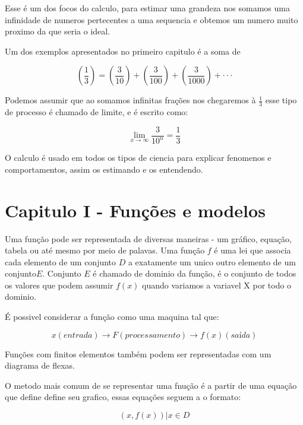\documentclass[paper=a4, fontsize=11pt]{scrartcl} %
\numberwithin{equation}{section} %
\numberwithin{figure}{section} %
\numberwithin{table}{section} %
\begin{document}
Esse é um dos focos do calculo, para estimar uma grandeza nos somamos uma infinidade de numeros pertecentes a uma sequencia e obtemos um numero muito proximo da que seria o ideal.

Um dos exemplos apresentados no primeiro capitulo é a soma de 

\begin{equation}
\left(\frac{1}{3}\right) = \left(\frac{3}{10}\right) + \left(\frac{3}{100}\right) + \left(\frac{3}{1000}\right) + \cdot\cdot\cdot
\end{equation}

Podemos assumir que ao somamos infinitas frações nos chegaremos à $\frac{1}{3}$ esse tipo de processo é chamado de limite, e é escrito como: 

\begin{equation}
\lim_{x \to \infty} \frac{3}{10^n} = \frac{1}{3}
\end{equation}

O calculo é usado em todos os tipos de ciencia para explicar fenomenos e comportamentos, assim os estimando e os entendendo.

\section{Capitulo I - Funções e modelos}

Uma função pode ser representada de diversas maneiras - um gráfico, equação, tabela ou até mesmo por meio de palavas.
Uma função $ f $ é uma lei que associa cada elemento de um conjunto $ D $ a exatamente um unico outro elemento de um conjunto$ E $.
Conjunto $ E $ é chamado de dominio da função, é o conjunto de todos os valores que podem assumir $ f(x) $ quando variamos a variavel X por todo o dominio.

É possivel considerar a função como uma maquina tal que:

\begin{equation}
x (entrada) \rightarrow F (processamento) \rightarrow f(x) (saída)
\end{equation}

Funções com finitos elementos também podem ser representadas com um diagrama de flexas.

O metodo mais comum de se representar uma fnução é a partir de uma equação que define define seu grafico, essas equações seguem a o formato:

\begin{equation}
{(x, f(x)) | x \in D}
\end{equation}
\end{document}
